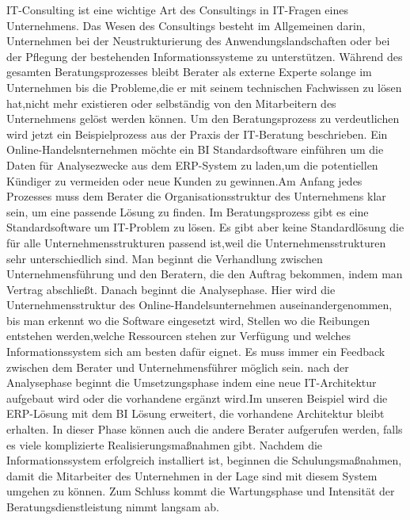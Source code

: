 IT-Consulting ist eine wichtige Art des Consultings in IT-Fragen eines Unternehmens. Das Wesen des Consultings besteht im Allgemeinen darin, Unternehmen bei der Neustrukturierung des Anwendungslandschaften oder bei der Pflegung der bestehenden Informationssysteme zu unterstützen. Während des gesamten Beratungsprozesses bleibt Berater als externe Experte solange im Unternehmen bis die Probleme,die er mit seinem technischen Fachwissen zu lösen hat,nicht mehr existieren oder selbständig von den Mitarbeitern des Unternehmens gelöst werden können.
Um den Beratungsprozess zu verdeutlichen wird jetzt ein Beispielprozess aus der Praxis der IT-Beratung beschrieben. Ein Online-Handelsnternehmen möchte ein BI Standardsoftware einführen um die Daten für Analysezwecke aus dem ERP-System zu laden,um die potentiellen Kündiger zu vermeiden oder neue Kunden zu gewinnen.Am Anfang jedes Prozesses muss dem Berater die Organisationsstruktur des Unternehmens klar sein, um eine passende Lösung zu finden. Im Beratungsprozess gibt es eine Standardsoftware um IT-Problem zu lösen. Es gibt aber keine Standardlösung die für alle Unternehmensstrukturen passend ist,weil die Unternehmensstrukturen sehr unterschiedlich sind. Man beginnt die Verhandlung zwischen Unternehmensführung und den Beratern, die den Auftrag bekommen, indem man Vertrag abschließt. Danach beginnt die Analysephase. Hier wird die Unternehmensstruktur des Online-Handelsunternehmen auseinandergenommen, bis man erkennt wo die Software eingesetzt wird, Stellen wo die Reibungen entstehen werden,welche Ressourcen stehen zur Verfügung und welches Informationssystem sich am besten dafür eignet.
Es muss immer ein Feedback zwischen dem Berater und Unternehmensführer möglich sein.
nach der Analysephase beginnt die Umsetzungsphase indem eine neue IT-Architektur aufgebaut wird oder die vorhandene ergänzt wird.Im unseren Beispiel wird die ERP-Lösung mit dem BI Lösung erweitert, die vorhandene Architektur bleibt erhalten. In dieser Phase können auch die andere Berater aufgerufen werden, falls es viele komplizierte Realisierungsmaßnahmen gibt.
Nachdem die Informationssystem erfolgreich installiert ist, beginnen die Schulungsmaßnahmen, damit die Mitarbeiter des Unternehmen in der Lage sind mit diesem System umgehen zu können. Zum Schluss kommt die Wartungsphase und Intensität der Beratungsdienstleistung nimmt langsam ab. 
